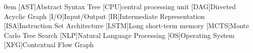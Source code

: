 \begin{acronym}[LSTM]\itemsep0em
    [AST]{Abstract Syntax Tree}
    [CPU]{central processing unit}
    [DAG]{Directed Acyclic Graph}
    [I/O]{Input/Output}
    [IR]{Intermediate Representation}
    [ISA]{Instruction Set Architecture}
    [LSTM]{Long short-term memory}
    [MCTS]{Monte Carlo Tree Search}
    [NLP]{Natural Language Processing}
    [OS]{Operating System}
    [XFG]{Contextual Flow Graph}
\end{acronym}
